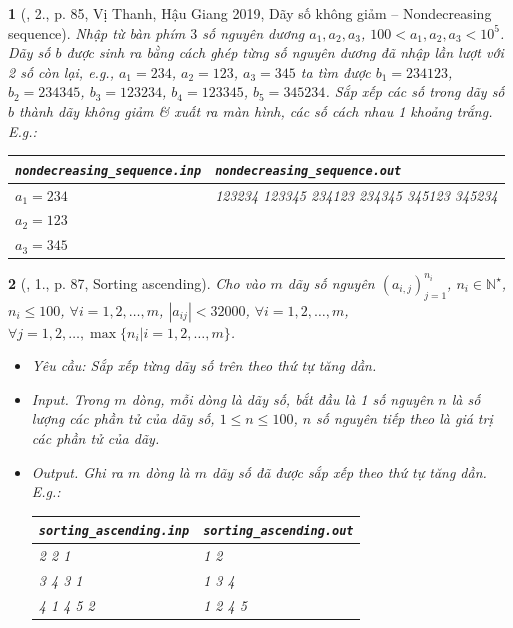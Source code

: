 \documentclass{article}
\newtheorem{baitoan}{}
\begin{document}
\begin{baitoan}[\cite{VietSTEM2021}, 2., p. 85, Vị Thanh, Hậu Giang 2019, Dãy số không giảm -- Nondecreasing sequence]
	Nhập từ bàn phím $3$ số nguyên dương $a_1,a_2,a_3$, $100 < a_1,a_2,a_3 < 10^5$. Dãy số $b$ được sinh ra bằng cách ghép từng số nguyên dương đã nhập lần lượt với 2 số còn lại, e.g., $a_1 = 234$, $a_2 = 123$, $a_3 = 345$ ta tìm được $b_1 = 234123$, $b_2 = 234345$, $b_3 = 123234$, $b_4 = 123345$, $b_5 = 345234$. Sắp xếp các số trong dãy số $b$ thành dãy không giảm \& xuất ra màn hình, các số cách nhau 1 khoảng trắng. E.g.:
	\begin{table}[H]
		\centering
		\begin{tabular}{|l|l|}
			\hline
			\verb|nondecreasing_sequence.inp| & \verb|nondecreasing_sequence.out| \\
			\hline
			$a_1 = 234$  & 123234 123345 234123 234345 345123 345234 \\
			$a_2 = 123$ & \\
			$a_3 = 345$ & \\
			\hline
		\end{tabular}
	\end{table}
\end{baitoan}

\begin{baitoan}[\cite{VietSTEM2021}, 1., p. 87, Sorting ascending]
	Cho vào $m$ dãy số nguyên $(a_{i,j})_{j=1}^{n_i}$, $n_i\in\mathbb{N}^\star$, $n_i\le100$, $\forall i = 1,2,\ldots,m$, $|a_{ij}| < 32000$, $\forall i = 1,2,\ldots,m$, $\forall j = 1,2,\ldots,\max\{n_i|i = 1,2,\ldots,m\}$.
	\begin{itemize}
		\item {\sf Yêu cầu:} Sắp xếp từng dãy số trên theo thứ tự tăng dần.
		\item {\sf Input.} Trong $m$ dòng, mỗi dòng là dãy số, bắt đầu là 1 số nguyên $n$ là số lượng các phần tử của dãy số, $1\le n\le100$, $n$ số nguyên tiếp theo là giá trị các phần tử của dãy.
		\item {\sf Output.} Ghi ra $m$ dòng là $m$ dãy số đã được sắp xếp theo thứ tự tăng dần. E.g.:
		\begin{table}[H]
			\centering
			\begin{tabular}{|l|l|}
				\hline
				\verb|sorting_ascending.inp| & \verb|sorting_ascending.out| \\
				\hline
				2 2 1  & 1 2 \\
				3 4 3 1 & 1 3 4 \\
				4 1 4 5 2 & 1 2 4 5 \\
				\hline
			\end{tabular}
		\end{table}
	\end{itemize}
\end{baitoan}
\end{document}
